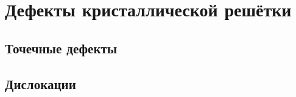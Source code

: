 \chapter{Дефекты кристаллической решётки}\label{ch:defects}


\section{Точечные дефекты}\label{sec:point}







\section{Дислокации}\label{sec:disl}









